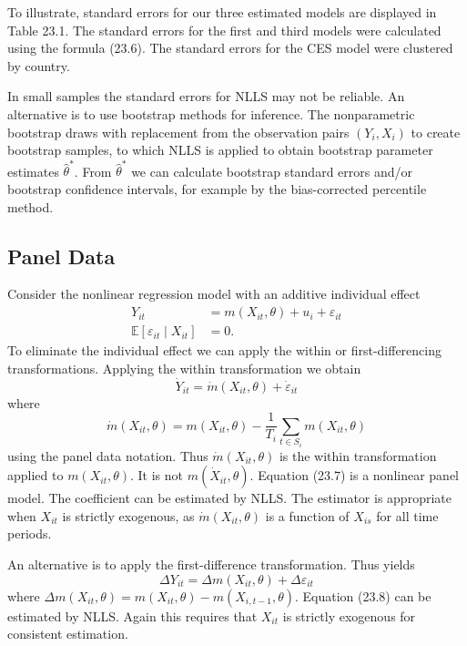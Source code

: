 \documentclass[10pt]{article}
\begin{document}
To illustrate, standard errors for our three estimated models are displayed in Table 23.1. The standard errors for the first and third models were calculated using the formula (23.6). The standard errors for the CES model were clustered by country.

In small samples the standard errors for NLLS may not be reliable. An alternative is to use bootstrap methods for inference. The nonparametric bootstrap draws with replacement from the observation pairs $\left(Y_{i}, X_{i}\right)$ to create bootstrap samples, to which NLLS is applied to obtain bootstrap parameter estimates $\widehat{\theta}^{*}$. From $\widehat{\theta}^{*}$ we can calculate bootstrap standard errors and/or bootstrap confidence intervals, for example by the bias-corrected percentile method.

\subsection{Panel Data}
Consider the nonlinear regression model with an additive individual effect
$$
\begin{aligned}
Y_{i t} &=m\left(X_{i t}, \theta\right)+u_{i}+\varepsilon_{i t} \\
\mathbb{E}\left[\varepsilon_{i t} \mid X_{i t}\right] &=0 .
\end{aligned}
$$
To eliminate the individual effect we can apply the within or first-differencing transformations. Applying the within transformation we obtain
$$
\dot{Y}_{i t}=\dot{m}\left(X_{i t}, \theta\right)+\dot{\varepsilon}_{i t}
$$
where
$$
\dot{m}\left(X_{i t}, \theta\right)=m\left(X_{i t}, \theta\right)-\frac{1}{T_{i}} \sum_{t \in S_{i}} m\left(X_{i t}, \theta\right)
$$
using the panel data notation. Thus $\dot{m}\left(X_{i t}, \theta\right)$ is the within transformation applied to $m\left(X_{i t}, \theta\right)$. It is not $m\left(\dot{X}_{i t}, \theta\right)$. Equation (23.7) is a nonlinear panel model. The coefficient can be estimated by NLLS. The estimator is appropriate when $X_{i t}$ is strictly exogenous, as $\dot{m}\left(X_{i t}, \theta\right)$ is a function of $X_{i s}$ for all time periods.

An alternative is to apply the first-difference transformation. Thus yields
$$
\Delta Y_{i t}=\Delta m\left(X_{i t}, \theta\right)+\Delta \varepsilon_{i t}
$$
where $\Delta m\left(X_{i t}, \theta\right)=m\left(X_{i t}, \theta\right)-m\left(X_{i, t-1}, \theta\right)$. Equation (23.8) can be estimated by NLLS. Again this requires that $X_{i t}$ is strictly exogenous for consistent estimation.
\end{document}
